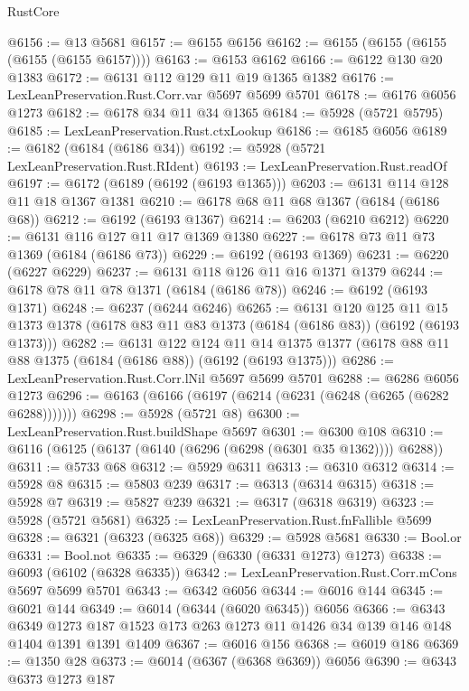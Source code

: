 \begin{lexlean}{RustCore}
\begin{coremodule}
@6156 := @13 @5681
@6157 := @6155 @6156
@6162 := @6155 (@6155 (@6155 (@6155 (@6155 @6157))))
@6163 := @6153 @6162
@6166 := @6122 @130 @20 @1383
@6172 := @6131 @112 @129 @11 @19 @1365 @1382
@6176 := LexLeanPreservation.Rust.Corr.var @5697 @5699 @5701
@6178 := @6176 @6056 @1273
@6182 := @6178 @34 @11 @34 @1365
@6184 := @5928 (@5721 @5795)
@6185 := LexLeanPreservation.Rust.ctxLookup
@6186 := @6185 @6056
@6189 := @6182 (@6184 (@6186 @34))
@6192 := @5928 (@5721 LexLeanPreservation.Rust.RIdent)
@6193 := LexLeanPreservation.Rust.readOf
@6197 := @6172 (@6189 (@6192 (@6193 @1365)))
@6203 := @6131 @114 @128 @11 @18 @1367 @1381
@6210 := @6178 @68 @11 @68 @1367 (@6184 (@6186 @68))
@6212 := @6192 (@6193 @1367)
@6214 := @6203 (@6210 @6212)
@6220 := @6131 @116 @127 @11 @17 @1369 @1380
@6227 := @6178 @73 @11 @73 @1369 (@6184 (@6186 @73))
@6229 := @6192 (@6193 @1369)
@6231 := @6220 (@6227 @6229)
@6237 := @6131 @118 @126 @11 @16 @1371 @1379
@6244 := @6178 @78 @11 @78 @1371 (@6184 (@6186 @78))
@6246 := @6192 (@6193 @1371)
@6248 := @6237 (@6244 @6246)
@6265 := @6131
    @120
    @125
    @11
    @15
    @1373
    @1378
    (@6178 @83 @11 @83 @1373 (@6184 (@6186 @83)) (@6192 (@6193 @1373)))
@6282 := @6131
    @122
    @124
    @11
    @14
    @1375
    @1377
    (@6178 @88 @11 @88 @1375 (@6184 (@6186 @88)) (@6192 (@6193 @1375)))
@6286 := LexLeanPreservation.Rust.Corr.lNil @5697 @5699 @5701
@6288 := @6286 @6056 @1273
@6296 := @6163 (@6166 (@6197 (@6214 (@6231 (@6248 (@6265 (@6282 @6288)))))))
@6298 := @5928 (@5721 @8)
@6300 := LexLeanPreservation.Rust.buildShape @5697
@6301 := @6300 @108
@6310 := @6116 (@6125 (@6137 (@6140 (@6296 (@6298 (@6301 @35 @1362)))) @6288))
@6311 := @5733 @68
@6312 := @5929 @6311
@6313 := @6310 @6312
@6314 := @5928 @8
@6315 := @5803 @239
@6317 := @6313 (@6314 @6315)
@6318 := @5928 @7
@6319 := @5827 @239
@6321 := @6317 (@6318 @6319)
@6323 := @5928 (@5721 @5681)
@6325 := LexLeanPreservation.Rust.fnFallible @5699
@6328 := @6321 (@6323 (@6325 @68))
@6329 := @5928 @5681
@6330 := Bool.or
@6331 := Bool.not
@6335 := @6329 (@6330 (@6331 @1273) @1273)
@6338 := @6093 (@6102 (@6328 @6335))
@6342 := LexLeanPreservation.Rust.Corr.mCons @5697 @5699 @5701
@6343 := @6342 @6056
@6344 := @6016 @144
@6345 := @6021 @144
@6349 := @6014 (@6344 (@6020 @6345)) @6056
@6366 := @6343
    @6349
    @1273
    @187
    @1523
    @173
    @263
    @1273
    @11
    @1426
    @34
    @139
    @146
    @148
    @1404
    @1391
    @1391
    @1409
@6367 := @6016 @156
@6368 := @6019 @186
@6369 := @1350 @28
@6373 := @6014 (@6367 (@6368 @6369)) @6056
@6390 := @6343
    @6373
    @1273
    @187

\end{coremodule}
\end{lexlean}
